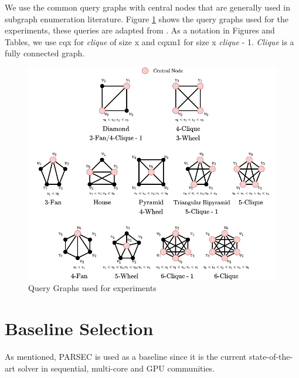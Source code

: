 {We use the common query graphs with central nodes that are generally used in subgraph enumeration literature.
Figure \ref{fig:queries} shows the query graphs used for the experiments, these queries are adapted from \cite{PARSEC_VD}.
As a notation in Figures and Tables, we use cqx for \textit{clique} of size x and cqxm1 for size x \textit{clique} - 1.
\textit{Clique} is a fully connected graph.
\begin{figure}
    \includegraphics[width=\textwidth]{fig/improvements/Templates.png}
    \caption{Query Graphs used for experiments}
    \label{fig:queries}
\end{figure}

\section{Baseline Selection}
As mentioned, PARSEC \cite{PARSEC_VD} is used as a baseline since it is the current state-of-the-art solver in sequential, multi-core and GPU communities.

}
